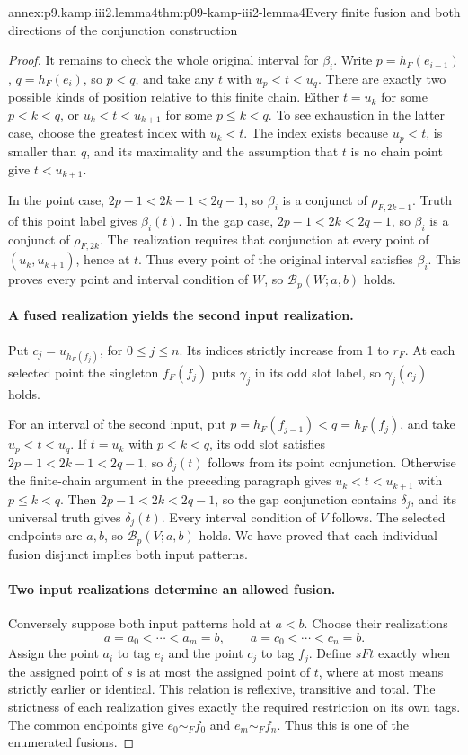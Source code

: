 \begin{annexitem}{annex:p9.kamp.iii2.lemma4}{thm:p09-kamp-iii2-lemma4}{Every finite fusion and both directions of the conjunction construction}
\begin{proof}
It remains to check the whole original interval for \(\beta_i\).
Write \(p=h_F(e_{i-1})\), \(q=h_F(e_i)\), so \(p<q\), and
take any \(t\) with \(u_p<t<u_q\). There are exactly two possible
kinds of position relative to this finite chain. Either \(t=u_k\)
for some \(p<k<q\), or
\(u_k<t<u_{k+1}\) for some \(p\leq k<q\). To see exhaustion
in the latter case, choose the greatest index with \(u_k<t\).
The index exists because \(u_p<t\), is smaller than \(q\), and
its maximality and the assumption that \(t\) is no chain point give
\(t<u_{k+1}\).

In the point case,
\(2p-1<2k-1<2q-1\), so \(\beta_i\) is a conjunct of
\(\rho_{F,2k-1}\). Truth of this point label gives \(\beta_i(t)\).
In the gap case,
\(2p-1<2k<2q-1\), so \(\beta_i\) is a conjunct of
\(\rho_{F,2k}\). The realization requires that conjunction at every
point of \((u_k,u_{k+1})\), hence at \(t\). Thus every point of
the original interval satisfies \(\beta_i\).
This proves every point and interval condition of \(W\), so
\(\mathcal B_p(W;a,b)\) holds.

\paragraph{A fused realization yields the second input realization.}
Put \(c_j=u_{h_F(f_j)}\), for \(0\leq j\leq n\). Its indices
strictly increase from 1 to \(r_F\). At each selected point the
singleton \(f_F(f_j)\) puts \(\gamma_j\) in its odd slot label,
so \(\gamma_j(c_j)\) holds.

For an interval of the second input, put
\(p=h_F(f_{j-1})<q=h_F(f_j)\), and take
\(u_p<t<u_q\). If \(t=u_k\) with \(p<k<q\), its odd slot
satisfies \(2p-1<2k-1<2q-1\), so \(\delta_j(t)\) follows
from its point conjunction. Otherwise the finite-chain argument in the
preceding paragraph gives \(u_k<t<u_{k+1}\) with \(p\leq k<q\).
Then \(2p-1<2k<2q-1\), so the gap conjunction contains
\(\delta_j\), and its universal truth gives \(\delta_j(t)\).
Every interval condition of \(V\) follows. The selected endpoints
are \(a,b\), so \(\mathcal B_p(V;a,b)\) holds. We have proved
that each individual fusion disjunct implies both input patterns.

\paragraph{Two input realizations determine an allowed fusion.}
Conversely suppose both input patterns hold at \(a<b\). Choose their
realizations
\[
 a=a_0<\cdots<a_m=b,
                  \qquad a=c_0<\cdots<c_n=b.
\]
Assign the point \(a_i\) to tag \(e_i\) and the point \(c_j\)
to tag \(f_j\). Define \(sFt\) exactly when the assigned point of
\(s\) is at most the assigned point of \(t\), where at most means
strictly earlier or identical. This relation is reflexive, transitive
and total. The strictness of each realization gives exactly the required
restriction on its own tags. The common endpoints give
\(e_0\sim_F f_0\) and \(e_m\sim_F f_n\). Thus this is one
of the enumerated fusions.


\end{proof}
\end{annexitem}
